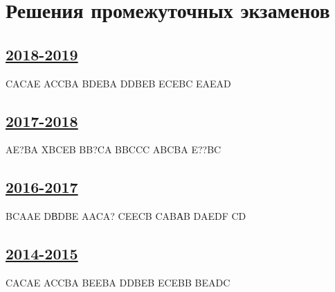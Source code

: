 \thispagestyle{empty}
\section{Решения промежуточных экзаменов}

\subsection[2018-2019]{\hyperref[sec:midterm_exam_2018_2019]{2018-2019}}
\label{sec:sol_midterm_exam_2018_2019}

CACAE ACCBA BDEBA DDBEB ECEBC EAEAD

\subsection[2017-2018]{\hyperref[sec:midterm_exam_2017_2018]{2017-2018}}
\label{sec:sol_midterm_exam_2017_2018}

AE?BA XBCEB BB?CA BBCCC ABCBA E??BC

\subsection[2016-2017]{\hyperref[sec:midterm_exam_2016_2017]{2016-2017}}
\label{sec:sol_midterm_exam_2016_2017}

BCAAE DВDBE AACA? CEECB CABАB DAEDF CD

\subsection[2014-2015]{\hyperref[sec:midterm_exam_2014_2015]{2014-2015}}
\label{sec:sol_midterm_exam_2014_2015}

CACAE ACCBA BEEBA DDBEB ECEBB BEADC